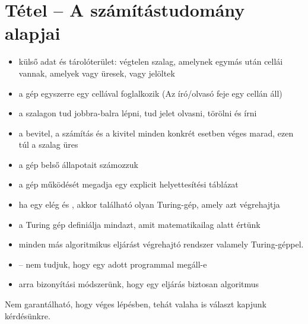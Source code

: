 \documentclass[main.tex]{subfiles}
\begin{document}
  \section{Tétel – A számítástudomány alapjai} %

  \begin{itemize}
    \item külső adat és tárolóterület:
    végtelen szalag, amelynek egymás után cellái vannak,
    amelyek vagy üresek, vagy jelöltek

    \item a gép egyszerre egy cellával foglalkozik
    (Az író/olvasó feje egy cellán áll)

    \item a szalagon tud jobbra-balra lépni,
    tud jelet olvasni, törölni és írni

    \item a bevitel, a számítás és a kivitel minden
    konkrét esetben véges marad, ezen túl a szalag üres

    \item a gép belső állapotait számozzuk
    
    \item a gép működését megadja egy explicit helyettesítési táblázat
    
    \item ha egy  elég
     és ,
    akkor található olyan Turing-gép, amely azt végrehajtja

    \item a Turing gép definiálja mindazt,
    amit matematikailag  alatt értünk

    \item minden más algoritmikus eljárást végrehajtó rendszer
     valamely Turing-géppel.

    \item {}
    – nem tudjuk, hogy egy adott programmal megáll-e

    \item {} arra bizonyítási módszerünk,
    hogy egy eljárás biztosan algoritmus
  \end{itemize}

  Nem garantálható, hogy véges lépésben,
  tehát valaha is választ kapjunk kérdésünkre.
  
\end{document}
